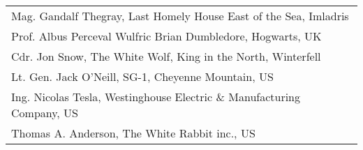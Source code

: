 
\begin{small}
\begin{tabular}{l}
Mag. Gandalf Thegray, Last Homely House East of the Sea, Imladris\\
Prof. Albus Perceval Wulfric Brian Dumbledore, Hogwarts, UK\\
Cdr. Jon Snow, The White Wolf, King in the North, Winterfell\\
Lt. Gen. Jack O'Neill, SG-1,  Cheyenne Mountain, US\\
Ing. Nicolas Tesla, Westinghouse Electric \& Manufacturing Company, US\\
Thomas A. Anderson, The White Rabbit inc., US
\end{tabular} 
\end{small}

